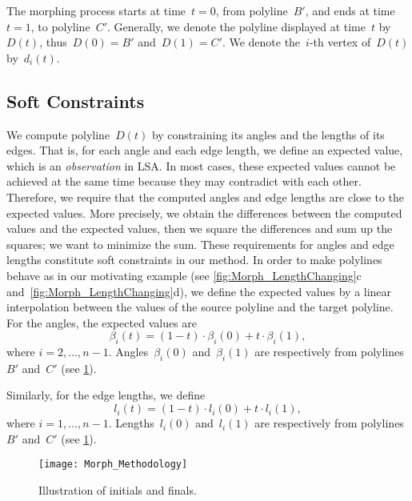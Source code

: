 The morphing process starts at time~$t=0$, from polyline~$B'$, 
and ends at time~$t=1$, to polyline~$C'$. 
Generally, we denote the polyline 
displayed at time~$t$ by~$D(t)$, 
thus~$D(0)=B'$ and~$D(1)=C'$. 
We denote the~$i$-th vertex of~$D(t)$ by~$d_i (t)$.


\subsection{Soft Constraints}
\label{sec:Morph_SoftConstraints}
We compute polyline~$D(t)$ by constraining its 
angles and the lengths of its edges. 
That is, for each angle and each edge length, 
we define an expected value, 
which is an \emph{observation} in LSA. 
In most cases, 
these expected values cannot be achieved at the same time 
because they may contradict with each other. 
Therefore, we require that
the computed angles and edge lengths 
are close to the expected values. 
More precisely, we obtain the differences 
between the computed values and the expected values,
then we square the differences and sum up the squares;
we want to minimize the sum.
These requirements for angles and edge lengths 
constitute soft constraints in our method.
In order to make polylines behave as in our motivating example 
(see \figs\ref{fig:Morph_LengthChanging}c 
and~\ref{fig:Morph_LengthChanging}d), 
we define the expected values by a linear interpolation 
between the values of 
the source polyline and the target polyline. 
For the angles, the expected values are
\begin{equation}
\label{eq:Morph_AngleConstraints}
\beta_i(t)=(1-t)\cdot \beta_i(0) + t\cdot\beta_i(1),
\end{equation}
where $i=2,\ldots,n-1$.
Angles~$\beta_i (0)$ and~$\beta_i (1)$ 
are respectively from polylines~$B'$ and~$C'$ 
(see \fig\ref{fig:Morph_InitialsFinals}).

Similarly, for the edge lengths, we define
\begin{equation}
\label{eq:Morph_LengthConstraints}
l_i(t)=(1-t) \cdot l_i(0)+t\cdot l_i(1),
\end{equation}
where $i=1,\ldots,n-1$.
Lengths~$l_i(0)$ and~$l_i(1)$
are respectively from polylines~$B'$ and~$C'$ 
(see \fig\ref{fig:Morph_InitialsFinals}).

\begin{figure}[tb]
	\centering	
	\texttt{[image: Morph\_Methodology]}
	\caption{Illustration of initials and finals.}
	\label{fig:Morph_InitialsFinals}
\end{figure}

